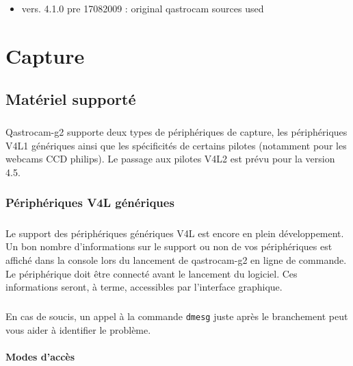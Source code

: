 \documentclass[11pt,a4paper]{book}
\begin{document}
\begin{itemize}
\paragraph*{}  
\item vers. 4.1.0 pre 17082009 : original qastrocam sources used
\end{itemize}

\chapter{Capture}

\section{Mat\'eriel support\'e}

\paragraph*{}
Qastrocam-g2 supporte deux types de p\'eriph\'eriques de capture, les p\'eriph\'eriques V4L1 
g\'en\'eriques ainsi que les sp\'ecificit\'es de certains pilotes (notamment pour les webcams
CCD philips). Le passage aux pilotes V4L2 est pr\'evu pour la version 4.5.

\subsection{P\'eriph\'eriques V4L g\'en\'eriques}

\paragraph*{}
Le support des p\'eriph\'eriques g\'en\'eriques V4L est encore en plein d\'eveloppement. Un
bon nombre d'informations sur le support ou non de vos p\'eriph\'eriques est affich\'e dans
la console lors du lancement de qastrocam-g2 en ligne de commande. Le p\'eriph\'erique doit
 \^etre  connect\'e avant le lancement du logiciel. Ces informations seront, \`a terme, 
 accessibles par l'interface graphique.

\paragraph*{} 
En cas de soucis, un  appel \`a la commande
 {\tt dmesg} juste apr\`es le branchement peut vous aider \`a identifier le probl\`eme. 

\subsubsection{Modes d'acc\`es}
\end{document}
